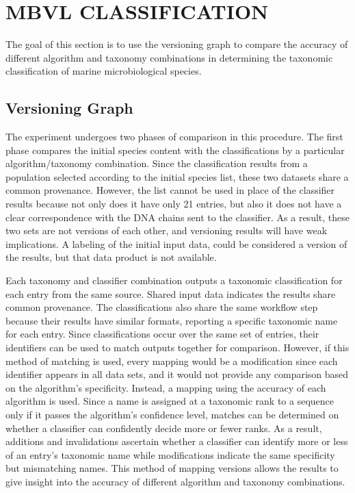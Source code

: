 
\chapter{MBVL CLASSIFICATION}\label{ch:mbvl`}

The goal of this section is to use the versioning graph to compare the accuracy of different algorithm and taxonomy combinations in determining the taxonomic classification of marine microbiological species.

\section{Versioning Graph}

The experiment undergoes two phases of comparison in this procedure.
The first phase compares the initial species content with the classifications by a particular algorithm/taxonomy combination.
Since the classification results from a population selected according to the initial species list, these two datasets share a common provenance.
However, the list cannot be used in place of the classifier results because not only does it have only 21 entries, but also it does not have a clear correspondence with the DNA chains sent to the classifier.
As a result, these two sets are not versions of each other, and versioning results will have weak implications.
A labeling of the initial input data, could be considered a version of the results, but that data product is not available.

Each taxonomy and classifier combination outputs a taxonomic classification for each entry from the same source.
Shared input data indicates the results share common provenance.
The classifications also share the same workflow step because their results have similar formats, reporting a specific taxonomic name for each entry.
Since classifications occur over the same set of entries, their identifiers can be used to match outputs together for comparison.
However, if this method of matching is used, every mapping would be a modification since each identifier appears in all data sets, and it would not provide any comparison based on the algorithm's specificity.
Instead, a mapping using the accuracy of each algorithm is used.
Since a name is assigned at a taxonomic rank to a sequence only if it passes the algorithm's confidence level, matches can be determined on whether a classifier can confidently decide more or fewer ranks.
As a result, additions and invalidations ascertain whether a classifier can identify more or less of an entry's taxonomic name while modifications indicate the same specificity but mismatching names.
This method of mapping versions allows the results to give insight into the accuracy of different algorithm and taxonomy combinations.

